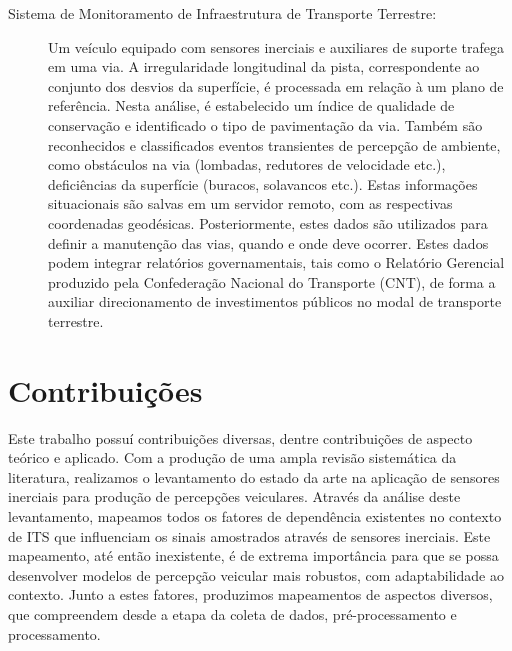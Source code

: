 \begin{description}
\item [Sistema de Monitoramento de Infraestrutura de Transporte Terrestre:] Um veículo equipado com sensores inerciais e auxiliares de suporte trafega em uma via. A irregularidade longitudinal da pista, correspondente ao conjunto dos desvios da superfície, é processada em relação à um plano de referência. Nesta análise, é estabelecido um índice de qualidade de conservação e identificado o tipo de pavimentação da via. Também são reconhecidos e classificados eventos transientes de percepção de ambiente, como obstáculos na via (lombadas, redutores de velocidade etc.), deficiências da superfície (buracos, solavancos etc.). Estas informações situacionais são salvas em um servidor remoto, com as respectivas coordenadas geodésicas. Posteriormente, estes dados são utilizados para definir a manutenção das vias, quando e onde deve ocorrer. Estes dados podem integrar relatórios governamentais, tais como o Relatório Gerencial produzido pela Confederação Nacional do Transporte (CNT), de forma a auxiliar direcionamento de investimentos públicos no modal de transporte terrestre.

\end{description}

\section{Contribuições}

Este trabalho possuí contribuições diversas, dentre contribuições de aspecto teórico e aplicado. Com a produção de uma ampla revisão sistemática da literatura, realizamos o levantamento do estado da arte na aplicação de sensores inerciais para produção de percepções veiculares. Através da análise deste levantamento, mapeamos todos os fatores de dependência existentes no contexto de ITS que influenciam os sinais amostrados através de sensores inerciais. Este mapeamento, até então inexistente, é de extrema importância para que se possa desenvolver modelos de percepção veicular mais robustos, com adaptabilidade ao contexto. Junto a estes fatores, produzimos mapeamentos de aspectos diversos, que compreendem desde a etapa da coleta de dados, pré-processamento e processamento.

